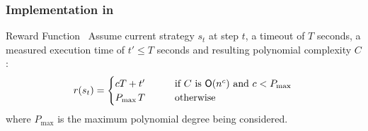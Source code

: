 \documentclass[xcolor=table%
,t]{beamer}
\begin{document}
\appendix

\begin{frame}

\end{frame}

\begin{frame}
  \frametitle{Implementation in \tct{}}

  \begin{block}{Reward Function~\footnotemark}
    Assume current strategy \(s_{t}\) at step \(t\), a timeout of \(T\) seconds, a measured
    execution time of \(t' \leqslant T\) seconds and resulting polynomial complexity \(C\):
    \begin{align*}
      r(s_{t}) =
      \begin{cases}
        c T + t'    & \qquad   \text{if $C$ is }\mathsf{O}(n^{c}) \text{ and } c < P_{\max{}}\\
        P_{\max{}} T & \qquad \text{otherwise}
      \end{cases}
    \end{align*}
    where \(P_{\max{}}\) is the maximum polynomial degree being considered.
  \end{block}

\end{frame}
\end{document}
